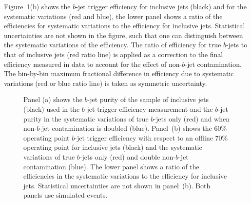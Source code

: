 Figure~\ref{fig:Eff_Purity}(b) shows the $b$-jet trigger efficiency for inclusive jets (black) and
for the systematic variations (red and blue),
the lower panel shows a ratio of the efficiencies for systematic variations to the efficiency for inclusive jets.
Statistical uncertainties are not shown in the figure, such that one can distinguish between the systematic variations of the efficiency.
The ratio of efficiency for true $b$-jets to that of inclusive jets (red ratio line) is applied as a correction to the final efficiency measured in data
to account for the effect of non-$b$-jet contamination.
The bin-by-bin maximum fractional difference in efficiency due to systematic variations (red or blue ratio line) is taken as symmetric uncertainty.


\begin{figure}[!htb]
  \begin{center}
    \captionsetup[subfigure]{aboveskip=0pt,justification=centering}
  \end{center}
\vspace{-1em}
  \caption[The $b$-jet purity and $b$-jet trigger efficiency when the size of the non-$b$-jet contamination is systematically varied.]
          {\label{fig:Eff_Purity} Panel (a) shows the $b$-jet purity of the sample of inclusive jets (black) used in the $b$-jet trigger efficiency measurement
    and the $b$-jet purity in the systematic variations of true $b$-jets only (red) and when non-$b$-jet contamination is doubled (blue).
    Panel~(b) shows the 60\% operating point $b$-jet trigger efficiency with respect to an offline 70\% operating point for inclusive jets (black)
    and the systematic variations of true $b$-jets only (red) and double non-$b$-jet contamination (blue).
    The lower panel shows a ratio of the efficiencies in the systematic variations to the efficiency for inclusive jets.
    Statistical uncertainties are not shown in panel~(b). Both panels use simulated events.}
\end{figure}

